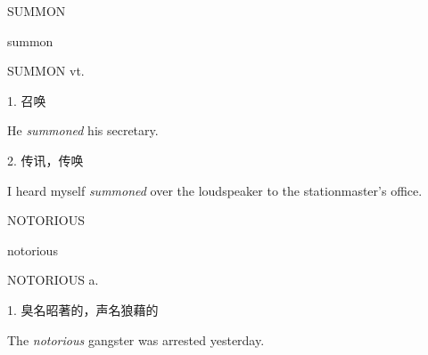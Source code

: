 \begin{flashcard}{
SUMMON

summon
}
\begin{center}
SUMMON vt. 
\end{center}
1. 召唤

He \textit{summoned} his secretary.

2. 传讯，传唤

I heard myself \textit{summoned} over the loudspeaker to the stationmaster's office.

\end{flashcard}
\begin{flashcard}{
NOTORIOUS

notorious
}
\begin{center}
NOTORIOUS a. 
\end{center}
1. 臭名昭著的，声名狼藉的

The \textit{notorious} gangster was arrested yesterday.

\end{flashcard}

